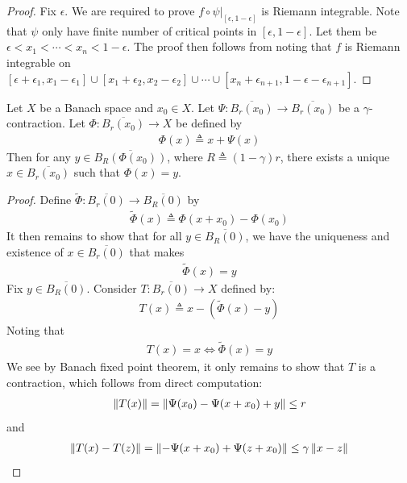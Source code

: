 \documentclass{report}
\begin{document}
\begin{proof}
Fix $\epsilon $. We are required to prove $f \circ \psi |_{[\epsilon ,1-\epsilon ]}$ is Riemann integrable. Note that $\psi$ only have finite number of critical points in $[\epsilon ,1-\epsilon ]$. Let them be $\epsilon  < x_1< \cdots < x_n < 1 - \epsilon $. The proof then follows from noting that $f$ is Riemann integrable on $[\epsilon + \epsilon_1 , x_1 - \epsilon_1] \cup  [x_1+ \epsilon_2, x_2- \epsilon_2] \cup  \cdots \cup  [x_n+ \epsilon_{n+1}, 1- \epsilon -\epsilon _{n+1}]$. 
\end{proof}
\begin{question}{}{}
Let $X$ be a Banach space and $x_0 \in X$. Let $\Psi : \overline{B_r(x_0)}\rightarrow \overline{B_r(x_0)}$ be a $\gamma $-contraction. Let $\Phi : \overline{B_r(x_0)}\rightarrow X$ be defined by 
\begin{align*}
\Phi (x)\triangleq x + \Psi (x)
\end{align*}
Then for any $ y \in \overline{B_R(\Phi (x_0))}$, where $R\triangleq (1-\gamma )r$, there exists a unique $x\in \overline{B_r(x_0)}$  such that $\Phi (x)=y$. 
\end{question}
\begin{proof}
Define $\tilde{\Phi}:\overline{B_r(0)}\rightarrow \overline{B_R(0)}$ by 
\begin{align*}
\tilde{\Phi} (x)\triangleq \Phi(x+x_0) - \Phi (x_0)
\end{align*}
It then remains to show that for all $y \in \overline{B_R(0)}$, we have the uniqueness and existence of $x \in \overline{B_r(0)}$ that makes 
\begin{align*}
\tilde{\Phi}(x)=y 
\end{align*}
Fix $y\in \overline{B_R(0)}$. Consider $T:\overline{B_r(0)}\rightarrow X$ defined by:
\begin{align*}
T(x)\triangleq x- \left(\tilde{\Phi}(x)-y  \right) 
\end{align*}
Noting that 
\begin{align*}
T(x)=x \iff  \tilde{\Phi}(x)=y  
\end{align*}
We see by Banach fixed point theorem, it only remains to show that $T$ is a contraction, which follows from direct computation: 
\begin{align*}
\left\| T(x) \right\|= \left\| \Psi (x_0)- \Psi (x+x_0)+y \right\| \leq r
\end{align*}
and 
\begin{align*}
\left\| T(x)-T(z) \right\|= \left\| - \Psi (x+x_0) + \Psi (z+x_0) \right\|  \leq \gamma  \left\| x-z \right\|
\end{align*}
\end{proof}
\end{document}
